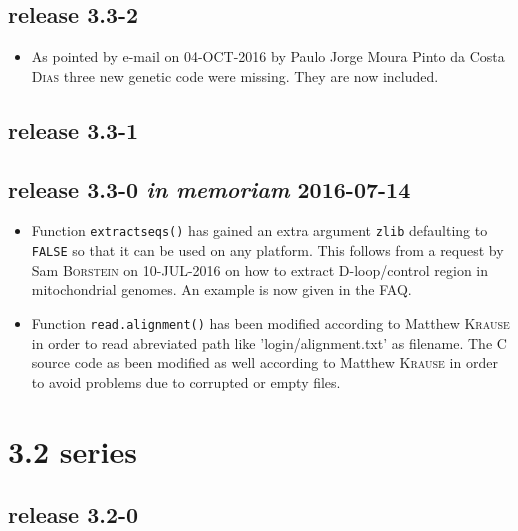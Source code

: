 \documentclass{article}
\begin{document}
\subsection*{release 3.3-2}

\begin{itemize}

\item As pointed by e-mail on 04-OCT-2016 by Paulo Jorge Moura Pinto da Costa \textsc{Dias} three new genetic code were missing. They are now included.
\end{itemize}

\subsection*{release 3.3-1}

\subsection*{release 3.3-0 \textit{in memoriam} 2016-07-14}

\begin{itemize}

\item Function \texttt{extractseqs()} has gained an extra argument \texttt{zlib}
defaulting to \texttt{FALSE} so that it can be used on any platform. This follows
from a request by Sam \textsc{Borstein} on 10-JUL-2016 on how to extract D-loop/control
region in mitochondrial genomes. An example is now given in the FAQ.

\item Function \texttt{read.alignment()} has been modified according to Matthew \textsc{Krause} in order to read abreviated path like '\texttildelow{}login/alignment.txt' as  filename. The C source code as been modified as well according to Matthew \textsc{Krause} in order to avoid  problems due to corrupted or empty files.

\end{itemize}

\section*{3.2 series}

\subsection*{release 3.2-0}
\end{document}
